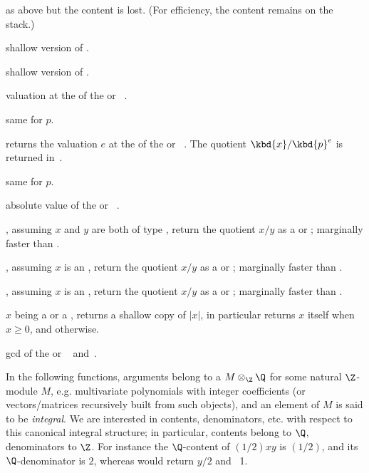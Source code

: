  as above but the content is lost.
(For efficiency, the content remains on the stack.)

 shallow version of .

 shallow version of .


 valuation at the  
of the  or ~.

 same for  $p$.

 returns the valuation $e$ at the
  of the  or ~. The quotient
$\kbd{x}/\kbd{p}^{e}$ is returned in~.

 same for  $p$.

 absolute value of the  or
~.

, assuming $x$ and $y$
are both of type , return the quotient $x/y$ as a  or
; marginally faster than .

, assuming $x$
is an , return the quotient $x/y$ as a  or
; marginally faster than .

, assuming $x$
is an , return the quotient $x/y$ as a  or
; marginally faster than .

 $x$ being a  or a , returns
a shallow copy of $|x|$, in particular returns $x$ itself when $x \geq 0$, and
 otherwise.

 gcd of the  or ~
and~.
\smallskip

In the following functions, arguments belong to a $M\otimes_\Z\Q$
for some natural $\Z$-module $M$, e.g. multivariate polynomials with integer
coefficients (or vectors/matrices recursively built from such objects), and
an element of $M$ is said to be \emph{integral}.
We are interested in contents, denominators, etc. with respect to this
canonical integral structure; in particular, contents belong to $\Q$,
denominators to $\Z$. For instance the $\Q$-content of $(1/2)xy$ is $(1/2)$,
and its $\Q$-denominator is $2$, whereas  would return $y/2$ and
~1.

